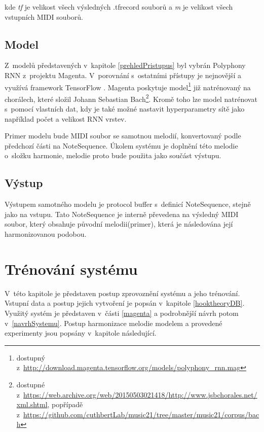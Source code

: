 kde \emph{tf} je velikost všech výsledných .tfrecord souborů 
a \emph{m} je velikost všech vstupních MIDI souborů.

\section{Model}
Z~modelů představených v~kapitole \ref{prehledPristupus} byl vybrán 
Polyphony RNN z~projektu Magenta.
V~porovnání s~ostatními přístupy je nejnovější a využívá framework TensorFlow
\cite{YinCheng_comparativeStudy,google_git_polyphony}.
Magenta poskytuje model\footnote{dostupný z~\url{http://download.magenta.tensorflow.org/models/polyphony_rnn.mag}} 
již natrénovaný na chorálech, které složil Johann Sebastian Bach\footnote{
dostupné z~\url{https://web.archive.org/web/20150503021418/http://www.jsbchorales.net/xml.shtml}, 
popřípadě z~\url{https://github.com/cuthbertLab/music21/tree/master/music21/corpus/bach}}.
Kromě toho lze model natrénovat s~pomocí vlastních dat,
kdy je také možné nastavit hyperparametry sítě jako například počet a velikost RNN vrstev.
\cite{google_git_polyphony}
\par

Primer modelu bude MIDI soubor se samotnou melodií, 
konvertovaný podle předchozí části na NoteSequence.
Úkolem systému je doplnění této melodie o~složku harmonie, 
melodie proto bude použita jako součást výstupu.

\section{Výstup}
Výstupem samotného modelu je protocol buffer s~definicí NoteSequence, 
stejně jako na vstupu.
Tato NoteSequence je interně převedena na výsledný MIDI soubor, 
který obsahuje původní melodii(primer), která je následována její harmonizovanou podobou.
\cite{google_git_polyphony}

\chapter{Trénování systému}
\label{trenovaniModelu}
V~této kapitole je představen postup zprovoznění systému a jeho trénování.
Vstupní data a postup jejich vytvoření je popsán v~kapitole \ref{hooktheoryDB}.
Využitý systém je představen v~části \ref{magenta} 
a podrobnější návrh potom v~\ref{navrhSystemu}.
Postup harmonizace melodie modelem a provedené experimenty jsou popsány v~kapitole následující.
\par

